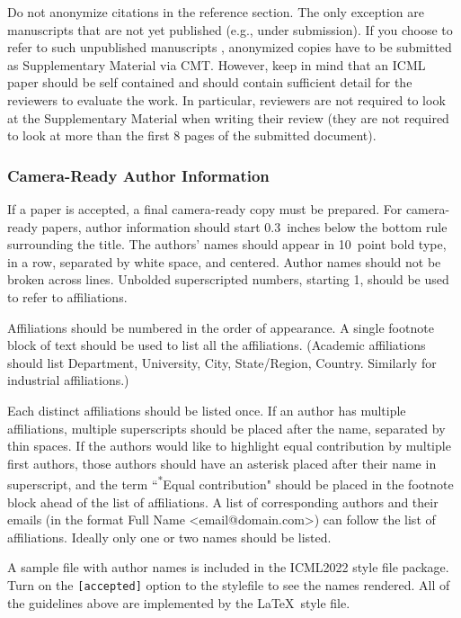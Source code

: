 \documentclass[nohyperref]{article}
\theoremstyle{plain}
\theoremstyle{definition}
\theoremstyle{remark}
\begin{document}
Do not anonymize citations in the reference section. The only exception are manuscripts that are
not yet published (e.g., under submission). If you choose to refer to
such unpublished manuscripts \cite{anonymous}, anonymized copies have
to be submitted
as Supplementary Material via CMT\@. However, keep in mind that an ICML
paper should be self contained and should contain sufficient detail
for the reviewers to evaluate the work. In particular, reviewers are
not required to look at the Supplementary Material when writing their
review (they are not required to look at more than the first $8$ pages of the submitted document).

\subsubsection{Camera-Ready Author Information}
\label{final author}

If a paper is accepted, a final camera-ready copy must be prepared.
%
For camera-ready papers, author information should start 0.3~inches below the
bottom rule surrounding the title. The authors' names should appear in 10~point
bold type, in a row, separated by white space, and centered. Author names should
not be broken across lines. Unbolded superscripted numbers, starting 1, should
be used to refer to affiliations.

Affiliations should be numbered in the order of appearance. A single footnote
block of text should be used to list all the affiliations. (Academic
affiliations should list Department, University, City, State/Region, Country.
Similarly for industrial affiliations.)

Each distinct affiliations should be listed once. If an author has multiple
affiliations, multiple superscripts should be placed after the name, separated
by thin spaces. If the authors would like to highlight equal contribution by
multiple first authors, those authors should have an asterisk placed after their
name in superscript, and the term ``\textsuperscript{*}Equal contribution"
should be placed in the footnote block ahead of the list of affiliations. A
list of corresponding authors and their emails (in the format Full Name
\textless{}email@domain.com\textgreater{}) can follow the list of affiliations.
Ideally only one or two names should be listed.

A sample file with author names is included in the ICML2022 style file
package. Turn on the \texttt{[accepted]} option to the stylefile to
see the names rendered. All of the guidelines above are implemented
by the \LaTeX\ style file.
\end{document}
